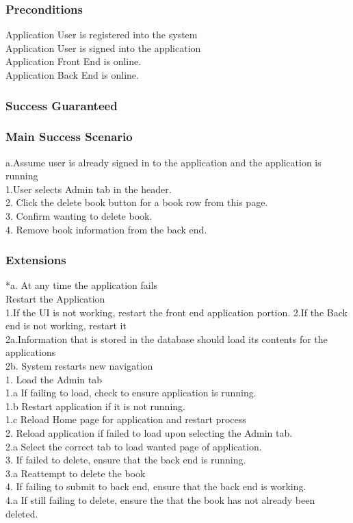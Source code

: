 \documentclass{article}
\begin{document}
	\subsubsection{\textbf{Preconditions}}
	Application User is registered into the system \\
	Application User is signed into the application \\
	Application Front End is online. \\
	Application Back End is online. \\
	
	\subsubsection{\textbf{Success Guaranteed}}
	
	\subsubsection{\textbf{Main Success Scenario}}
	a.Assume user is already signed in to the application and the application is running\\
	1.User selects Admin tab in the header. \\
	2. Click the delete book button for a book row from this page. \\
	3. Confirm wanting to delete book. \\
	4. Remove book information from the back end. \\
	
	
	\subsubsection{\textbf{Extensions}}
	*a. At any time the application fails \\
	Restart the Application \\
	1.If the UI is not working, restart the front end application portion.
	2.If the Back end is not working, restart it \\
	2a.Information that is stored in the database should load its contents for the applications \\
	2b. System restarts new navigation \\
	1. Load the Admin tab \\
	1.a  If failing to load, check to ensure application is running. \\
	1.b Restart application if it is not running. \\
	1.c Reload Home page for application and restart process \\
	2. Reload application if failed to load upon selecting the Admin tab. \\
	2.a Select the correct tab to load wanted page of application.\\
	3. If failed to delete, ensure that the back end is running. \\
	3.a Reattempt to delete the book\\
	4. If failing to submit to back end, ensure that the back end is working. \\
	4.a If still failing to delete, ensure the that the book has not already been deleted. \\
	
\end{document}
